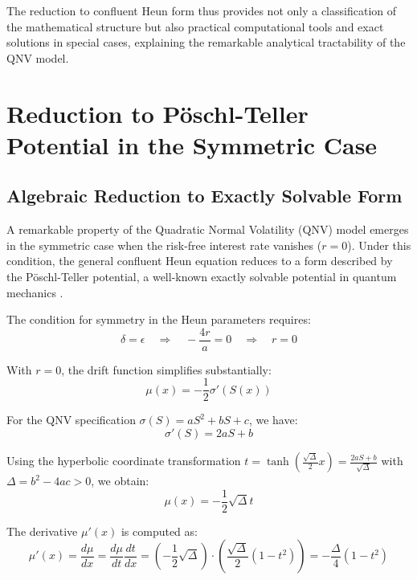 \documentclass[a4paper,11pt]{article}
\begin{document}
The reduction to confluent Heun form thus provides not only a classification of the mathematical structure but also practical computational tools and exact solutions in special cases, explaining the remarkable analytical tractability of the QNV model.

\section{Reduction to Pöschl-Teller Potential in the Symmetric Case}

\subsection{Algebraic Reduction to Exactly Solvable Form}

A remarkable property of the Quadratic Normal Volatility (QNV) model emerges in the symmetric case when the risk-free interest rate vanishes ($r = 0$). Under this condition, the general confluent Heun equation reduces to a form described by the Pöschl-Teller potential, a well-known exactly solvable potential in quantum mechanics \cite{CarrFisherRuf2013,Zuhlsdorff2001}.

The condition for symmetry in the Heun parameters requires:
\begin{equation}
\delta = \epsilon \quad \Rightarrow \quad -\frac{4r}{a} = 0 \quad \Rightarrow \quad r = 0
\end{equation}

With $r = 0$, the drift function simplifies substantially:
\begin{equation}
\mu(x) = -\frac{1}{2}\sigma'(S(x))
\end{equation}

For the QNV specification $\sigma(S) = aS^2 + bS + c$, we have:
\begin{equation}
\sigma'(S) = 2aS + b
\end{equation}

Using the hyperbolic coordinate transformation $t = \tanh\left(\frac{\sqrt{\Delta}}{2}x\right) = \frac{2aS + b}{\sqrt{\Delta}}$ with $\Delta = b^2 - 4ac > 0$, we obtain:
\begin{equation}
\mu(x) = -\frac{1}{2}\sqrt{\Delta}t
\end{equation}

The derivative $\mu'(x)$ is computed as:
\begin{equation}
\mu'(x) = \frac{d\mu}{dx} = \frac{d\mu}{dt}\frac{dt}{dx} = \left(-\frac{1}{2}\sqrt{\Delta}\right)\cdot\left(\frac{\sqrt{\Delta}}{2}(1 - t^2)\right) = -\frac{\Delta}{4}(1 - t^2)
\end{equation}
\end{document}
